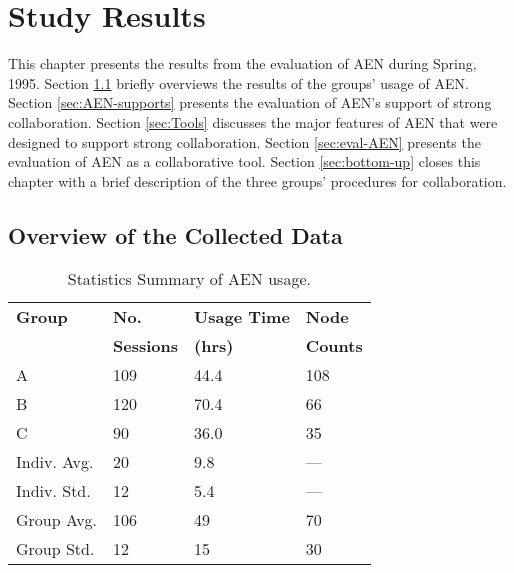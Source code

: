 

\newpage
\chapter{Study Results}
\label{sec:analysis}

This chapter presents the results from the evaluation of AEN during Spring,
1995.  Section \ref{sec:data-overview} briefly overviews the results of the
groups' usage of AEN.  Section \ref{sec:AEN-supports} presents the
evaluation of AEN's support of strong collaboration.  Section
\ref{sec:Tools} discusses the major features of AEN that were designed to
support strong collaboration.  Section \ref{sec:eval-AEN} presents the
evaluation of AEN as a collaborative tool.  Section \ref{sec:bottom-up}
closes this chapter with a brief description of the three groups'
procedures for collaboration.


\section{Overview of the Collected Data}
\label{sec:data-overview}

\small
\begin{table}[htbp]
  \begin{center}
    \caption{Statistics Summary of AEN usage.}
    \begin{tabular}{|l|l|l|l|}
      \hline
      {\bf Group}&{\bf No.}&{\bf Usage Time}&{\bf Node}\\
      &{\bf Sessions}&{\bf (hrs)}&{\bf Counts}\\ \hline
      A&109&44.4&108\\ \hline
      B&120&70.4&66\\ \hline
      C&90&36.0&35\\\hline
      \hline
      Indiv. Avg.&20&9.8& ---\\ \hline
      \hline
      Indiv. Std.&12&5.4& ---\\ \hline
      \hline
      Group Avg.&106&49&70\\ \hline
      \hline
      Group Std.&12&15&30\\ \hline
    \end{tabular}
  \end{center}
  \label{tab:summary}
\end{table}  
\normalsize

